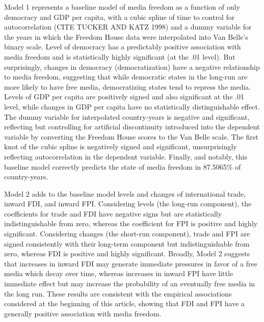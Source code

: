 \documentclass[a4paper]{article}\usepackage[]{graphicx}\usepackage[]{color}
\begin{document}
Model 1 represents a baseline model of media freedom as a function of only democracy and GDP per capita, with a cubic spline of time to control for autocorrelation (CITE TUCKER AND KATZ 1998) and a dummy variable for the years in which the Freedom House data were interpolated into Van Belle's binary scale. Level of democracy has a predictably positive association with media freedom and is statistically highly significant (at the .01 level). But surprisingly, changes in democracy (democratization) have a negative relationship to media freedom, suggesting that while democratic states in the long-run are more likely to have free media, democratizing states tend to repress the media. Levels of GDP per capita are positively signed and also significant at the .01 level, while changes in GDP per capita have no statistically distinguishable effect. The dummy variable for interpolated country-years is negative and significant, reflecting but controlling for artificial discontinuity introduced into the dependent variable by converting the Freedom House scores to the Van Belle scale. The first knot of the cubic spline is negatively signed and significant, unsurprisingly reflecting autocorrelation in the dependent variable. Finally, and notably, this baseline model correctly predicts the state of media freedom in 87.5065\% of country-years.

Model 2 adds to the baseline model levels and changes of international trade, inward FDI, and inward FPI. Considering levels (the long-run component), the coefficients for trade and FDI have negative signs but are statistically indistinguishable from zero, whereas the coefficient for FPI is positive and highly significant. Considering changes (the short-run component), trade and FPI are signed consistently with their long-term component but indistinguishable from zero, whereas FDI is positive and highly significant. Broadly, Model 2 suggests that increases in inward FDI may generate immediate pressures in favor of a free media which decay over time, whereas increases in inward FPI have little immediate effect but may increase the probability of an eventually free media in the long run. These results are consistent with the empirical associations considered at the beginning of this article, showing that FDI and FPI have a generally positive association with media freedom.
\end{document}
